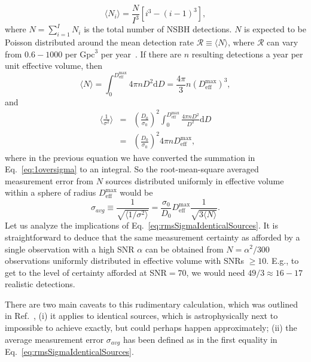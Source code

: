 \documentclass[aps,prd,amsmath,floats,floatfix, twocolumn,
superscriptaddress,nofootinbib,showpacs]{revtex4-1}
\newcommand{\D}{\mathrm{d}}
\newcommand{\deff}{D_\mathrm{eff}}
\begin{document}
$$
\langle N_i\rangle = \frac{N}{I^3} [i^3 - (i-1)^3],
$$
where $N=\sum_{i=1}^I N_i$ is the total number of NSBH detections. $N$ is expected
to be Poisson distributed around the mean detection rate
$\mathcal{R}\equiv\langle N\rangle$, where $\mathcal{R}$ can vary from $0.6-1000$ per
$\mathrm{Gpc}^3$ per year~\cite{Abadie:2010cfa}. If there are $n$ resulting detections
a year per unit effective volume, then
\begin{equation}
\langle N\rangle = \int_0^{\deff^\mathrm{max}} 4\pi n D^2 \D D = \frac{4\pi}{3} n (\deff^\mathrm{max})^3,
\end{equation}
and
\begin{eqnarray}
 \langle \frac{1}{\sigma^2}\rangle &=& \left(\frac{D_0}{\sigma_0}\right)^2 \int_0^{\deff^\mathrm{max}} \frac{4\pi n D^2 }{D^2}\D D\\
 &=& \left(\frac{D_0}{\sigma_0}\right)^2 4\pi n \deff^\mathrm{max},
\end{eqnarray}
where in the previous equation we have converted the summation in Eq.~\ref{eq:1oversigma} 
to an integral. So the root-mean-square averaged measurement error from $N$ sources 
distributed uniformly in effective volume within a sphere of radius $\deff^\mathrm{max}$
would be
\begin{equation}\label{eq:rmsSigmaIdenticalSources}
 \sigma_{avg} \equiv \frac{1}{\sqrt{\langle1/\sigma^{2}\rangle}} = \frac{\sigma_0}{D_0} \deff^\mathrm{max} \frac{1}{\sqrt{3\langle N\rangle}}.
\end{equation}
Let us analyze the implications of Eq.~\ref{eq:rmsSigmaIdenticalSources}. It is
straightforward to deduce that the same measurement certainty as afforded by a single
observation with a high SNR $\alpha$ can be obtained from $N = \alpha^2/300$ observations
uniformly distributed in effective volume with SNRs $\geq 10$. E.g., to get to the level 
of certainty afforded at SNR$=70$, we would need $49/3\approx 16-17$ realistic detections.

There are two main caveats to this rudimentary calculation, which was outlined in 
Ref.~\cite{Markakis:2010mp}, (i) it applies to identical sources,
which is astrophysically next to impossible to achieve exactly, but could perhaps happen 
approximately; (ii) the average measurement error $\sigma_{avg}$ has been defined as in 
the first equality in Eq.~\ref{eq:rmsSigmaIdenticalSources}. 

% 
\end{document}
